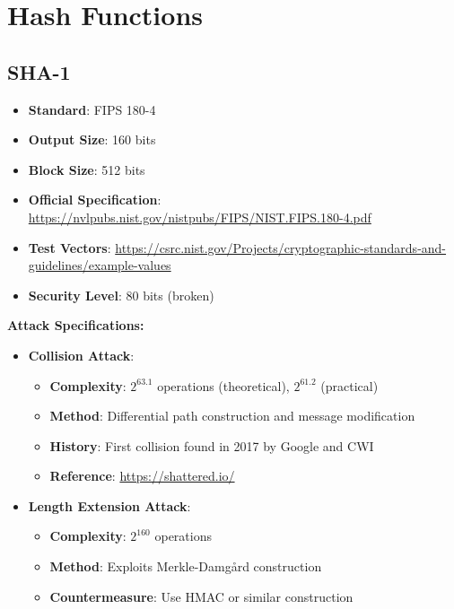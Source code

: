 \documentclass[11pt,a4paper]{article}
\begin{document}
\section{Hash Functions}

\subsection{SHA-1}
\begin{itemize}
    \item \textbf{Standard}: FIPS 180-4
    \item \textbf{Output Size}: 160 bits
    \item \textbf{Block Size}: 512 bits
    \item \textbf{Official Specification}: \url{https://nvlpubs.nist.gov/nistpubs/FIPS/NIST.FIPS.180-4.pdf}
    \item \textbf{Test Vectors}: \url{https://csrc.nist.gov/Projects/cryptographic-standards-and-guidelines/example-values}
    \item \textbf{Security Level}: 80 bits (broken)
\end{itemize}

\textbf{Attack Specifications:}
\begin{itemize}
    \item \textbf{Collision Attack}: 
    \begin{itemize}
        \item \textbf{Complexity}: $2^{63.1}$ operations (theoretical), $2^{61.2}$ (practical)
        \item \textbf{Method}: Differential path construction and message modification
        \item \textbf{History}: First collision found in 2017 by Google and CWI
        \item \textbf{Reference}: \url{https://shattered.io/}
    \end{itemize}
    \item \textbf{Length Extension Attack}: 
    \begin{itemize}
        \item \textbf{Complexity}: $2^{160}$ operations
        \item \textbf{Method}: Exploits Merkle-Damgård construction
        \item \textbf{Countermeasure}: Use HMAC or similar construction
    \end{itemize}
\end{itemize}
\end{document}
